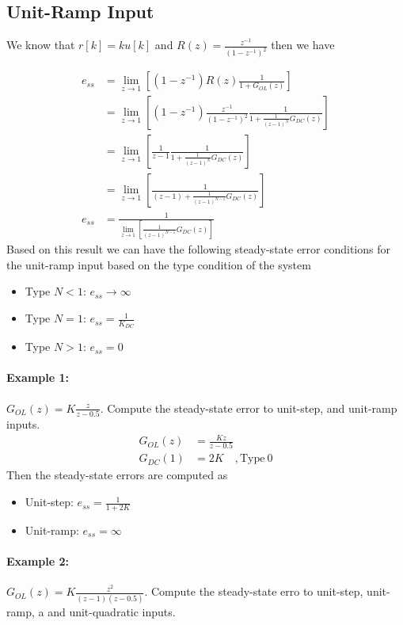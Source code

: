 \documentclass[twoside]{article}
\begin{document}
\newpage

\subsection*{Unit-Ramp Input}
%
We know that $r[k] = k u[k]$ and $R(z) = \frac{z^{-1}}{(1 - z^{-1})^2}$ then
we have

\begin{align*}
e_{ss} &= \lim_{z \to 1} \left[ \left(1 - z^{-1} \right) R(z) \frac{1}{1
         + G_{OL} (z) } \right]
\\
&= \lim_{z \to 1} \left[ \left(1 - z^{-1} \right) 
  \frac{z^{-1}}{(1 - z^{-1})^2} \frac{1}{1 +\frac{1}{(z-1)^N} G_{DC}(z) } \right]
\\
&= \lim_{z \to 1} \left[ \frac{1}{z - 1} \frac{1}{1 +\frac{1}{(z-1)^N}
  G_{DC}(z) } \right]
\\
&= \lim_{z \to 1} \left[ \frac{1}{(z-1) +\frac{1}{(z-1)^{N-1}}
  G_{DC}(z) } \right]
\\
e_{ss} &=  \frac{1}{ \lim_{z \to 1} \left[ \frac{1}{(z-1)^{N-1}}
  G_{DC}(z) \right] }
\end{align*}
%
Based on this result we can have the following steady-state
error conditions for the unit-ramp input based on the type 
condition of the system
%
\begin{itemize}
\item Type $N < 1$: $e_{ss} \to  \infty$
\item Type $N = 1$: $e_{ss} = \frac{1}{K_{DC}}$
\item Type $N > 1$: $e_{ss} = 0$
\end{itemize}

\paragraph{Example 1:} $G_{OL}(z) = K \frac{z}{z-0.5}$. Compute the steady-state error to unit-step, and unit-ramp inputs.
%
\begin{align*}
G_{OL}(z) &= \frac{K z}{z-0.5} 
\\
G_{DC}(1) &= 2 K \quad, \mathrm{Type} \ 0 
\end{align*}
%
Then the steady-state errors are computed as
%
\begin{itemize}
\item Unit-step: $e_{ss} = \frac{1}{1 + 2 K}$
\item Unit-ramp: $e_{ss} = \infty$
\end{itemize}

\paragraph{Example 2:} $G_{OL}(z) =
K \frac{z^2}{(z-1)(z-0.5)}$. Compute the steady-state erro to unit-step, unit-ramp, a
and unit-quadratic inputs.
\end{document}
